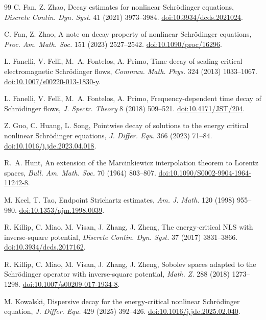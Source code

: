 \documentclass[preprint,12pt]{elsarticle}
\numberwithin{equation}{section}
\theoremstyle{definition}
\theoremstyle{remark}
\begin{document}
\begin{thebibliography}{99}
C. Fan, Z. Zhao,
Decay estimates for nonlinear Schr\"odinger equations,
\emph{Discrete Contin. Dyn. Syst.} 41 (2021) 3973--3984.
\href{https://doi.org/10.3934/dcds.2021024}
{doi:10.3934/dcds.2021024}.

C. Fan, Z. Zhao,
A note on decay property of nonlinear Schr\"odinger equations,
\emph{Proc. Am. Math. Soc.} 151 (2023) 2527--2542.
\href{https://doi.org/10.1090/proc/16296}
{doi:10.1090/proc/16296}.

L. Fanelli, V. Felli, M.~A. Fontelos, A. Primo,
Time decay of scaling critical electromagnetic Schr\"odinger flows,
\emph{Commun. Math. Phys.} 324 (2013) 1033--1067.
\href{https://doi.org/10.1007/s00220-013-1830-y}
{doi:10.1007/s00220-013-1830-y}.

L. Fanelli, V. Felli, M.~A. Fontelos, A. Primo,
Frequency-dependent time decay of Schr\"odinger flows,
\emph{J. Spectr. Theory} 8 (2018) 509--521.
\href{https://doi.org/10.4171/JST/204}
{doi:10.4171/JST/204}.

Z. Guo, C. Huang, L. Song,
Pointwise decay of solutions to the energy critical nonlinear
Schr\"odinger equations,
\emph{J. Differ. Equ.} 366 (2023) 71--84.
\href{https://doi.org/10.1016/j.jde.2023.04.018}
{doi:10.1016/j.jde.2023.04.018}.

R.~A. Hunt,
An extension of the Marcinkiewicz interpolation theorem to Lorentz
spaces,
\emph{Bull. Am. Math. Soc.} 70 (1964) 803--807.
\href{https://doi.org/10.1090/S0002-9904-1964-11242-8}
{doi:10.1090/S0002-9904-1964-11242-8}.

M. Keel, T. Tao,
Endpoint Strichartz estimates,
\emph{Am. J. Math.} 120 (1998) 955--980.
\href{https://doi.org/10.1353/ajm.1998.0039}
{doi:10.1353/ajm.1998.0039}.

R. Killip, C. Miao, M. Visan, J. Zhang, J. Zheng,
The energy-critical NLS with inverse-square potential,
\emph{Discrete Contin. Dyn. Syst.} 37 (2017) 3831--3866.
\href{https://doi.org/10.3934/dcds.2017162}
{doi:10.3934/dcds.2017162}.

R. Killip, C. Miao, M. Visan, J. Zhang, J. Zheng,
Sobolev spaces adapted to the Schr\"odinger operator with inverse-square
potential,
\emph{Math. Z.} 288 (2018) 1273--1298.
\href{https://doi.org/10.1007/s00209-017-1934-8}
{doi:10.1007/s00209-017-1934-8}.

M. Kowalski,
Dispersive decay for the energy-critical nonlinear Schr\"odinger
equation,
\emph{J. Differ. Equ.} 429 (2025) 392--426.
\href{https://doi.org/10.1016/j.jde.2025.02.040}
{doi:10.1016/j.jde.2025.02.040}.


\end{thebibliography}
\end{document}
